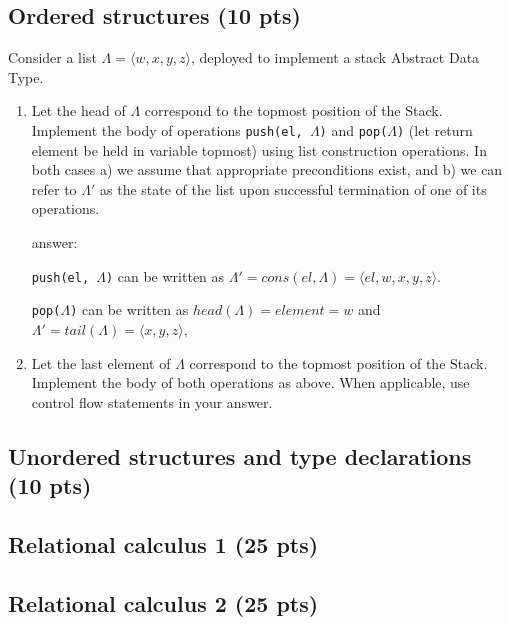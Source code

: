 \documentclass[12pt]{article}
\begin{document}
\newpage

\subsection{Ordered structures (10 pts)}

Consider a list $\Lambda = \langle w, x, y, z \rangle$, deployed to implement a stack Abstract Data Type.

\begin{enumerate}

\item Let the head of $\Lambda$ correspond to the topmost position of the Stack. Implement the body of operations \texttt{push(el, $\Lambda$)} and \texttt{pop($\Lambda$)} (let return element be held in variable topmost) using list construction operations. In both cases a)  we assume that appropriate preconditions exist, and b) we can refer to $\Lambda'$ as the state of the list upon successful termination of one of its operations.

\noindent answer: 

\indent \texttt{push(el, $\Lambda$)}  can be written as $\Lambda' = cons( el, \Lambda) = \langle el, w, x, y, z \rangle$.


\indent \texttt{pop($\Lambda$)}  can be written as $head(\Lambda) = element = w$ and $\Lambda' = tail(\Lambda) = \langle x, y, z \rangle$,

\item  Let the last element of $\Lambda$ correspond to the topmost position of the Stack. Implement the body of both operations as above. When applicable, use control flow statements in your answer.

\end{enumerate}

\newpage

\subsection{Unordered structures and type declarations (10 pts)}

\newpage

\subsection{Relational calculus 1 (25 pts)}

\newpage

\subsection{Relational calculus 2 (25 pts)}
\end{document}
